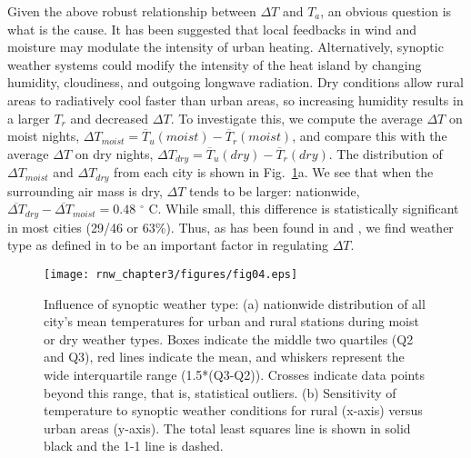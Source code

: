 {Given the above robust relationship between $\Delta T$ and $T_a$, an obvious question is what is the cause.  It has been suggested that local feedbacks in wind \citep{haeger1999advection} and moisture \citep{li2013synergistic} may modulate the intensity of urban heating. 
Alternatively, synoptic weather systems could modify the intensity of the heat island by changing humidity, cloudiness, and outgoing longwave radiation. Dry conditions allow rural areas to radiatively cool faster than urban areas, so increasing humidity results in a larger $T_r$ and decreased $\Delta T$. 
To investigate this, we compute the average $\Delta T$ on moist nights, $\Delta T _{moist} = \overline{T}_{u} (moist) - \overline{T}_{r} (moist) $, and compare this with the average $\Delta T$ on dry nights, $\Delta T _{dry} = \overline{T}_{u} (dry) - \overline{T}_{r} (dry) $. The distribution of $\Delta T_{moist}$ and $\Delta  T_{dry}$ from each city is shown in Fig.~\ref{fig:synoptic4}a.
We see that when the surrounding air mass is dry, $\Delta T$ tends to be larger: nationwide, $\overline{ \Delta T}_{{dry}}- \overline{\Delta T}_{	{moist}} = 0.48$ $^\circ$ C. %
While small, this difference is statistically significant in most cities (29/46 or 63\%). 
Thus, as has been found in \cite{sheridan2000evaluation} and \cite{hardin2017urban}, we find weather type as defined in \cite{sheridan2002redevelopment} to be an important factor in regulating $\Delta T$.

\begin{figure}
\texttt{[image: rnw\_chapter3/figures/fig04.eps]}
\caption{Influence of synoptic weather type: (a) nationwide distribution of all city's mean temperatures for urban and rural stations during moist or dry weather types. %
Boxes indicate the middle two quartiles (Q2 and Q3), red lines indicate the mean, and whiskers represent the wide interquartile range (1.5*(Q3-Q2)). Crosses indicate data points beyond this range, that is, statistical outliers. (b) Sensitivity of temperature to synoptic weather conditions for rural (x-axis) versus urban areas (y-axis). The total least squares line is shown in solid black and the 1-1 line is dashed.
}
\label{fig:synoptic4}
\end{figure}


}
